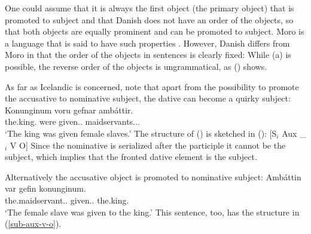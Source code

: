 One could assume that it is always the first object (the primary object) that is promoted to subject
and that Danish does not have an order of the objects, so that both objects are equally prominent
and can be promoted to subject. Moro is a language that is said to have such properties
\citep{AMM2013a}. However, Danish differs from Moro in that the order of the objects in sentences is
clearly fixed: While (a) is possible, the reverse order of the objects is ungrammatical, as
() shows.
\z



As far as Icelandic is concerned, \citet*[]{ZMT85a} note that apart from the possibility to
promote the accusative to nominative subject, the dative can become a quirky subject:
\ea
\label{ex-dat-subj-passive-ditransitive-icelandic}
\gll Konunginum voru gefnar ambáttir.\\
     the.king.\DAT{} were given.\F.\PL{} maidservants.\NOM.\F.\PL\\\icelandic
\glt `The king was given female slaves.'
\z
The structure of () is sketched in ():
\ea
\label{sub-aux-v-o}
{}[S$_i$ Aux \_$_i$ V O] 
\z
Since the nominative is serialized after the participle it cannot be the subject, which implies that
the fronted dative element is the subject.

Alternatively the accusative object is promoted to nominative subject:
\ea
\label{ex-nom-subj-passive-ditransitive-icelandic}
\gll Ambáttin var gefin konunginum.\\
     the.maidservant.\NOM.\SG{}  \AUX{} given.\F.\SG{} the.king.\DAT\\\icelandic
\glt `The female slave was given to the king.'
\z
This sentence, too, has the structure in (\ref{sub-aux-v-o}).

